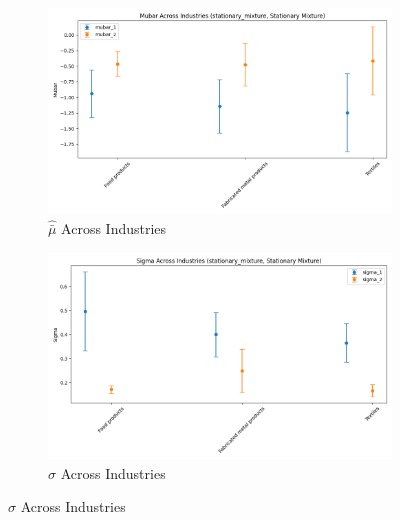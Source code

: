 \documentclass{article}
\begin{document}
\begin{figure}[ht!]
    \begin{subfigure}[t]{0.32\textwidth}
        \centering
        \includegraphics[width=\textwidth]{figure/stationary_mixture_mubar_across_industries.png}
        \caption{$\hat{\bar\mu}$ Across Industries}

    \end{subfigure}
    \begin{subfigure}[t]{0.32\textwidth}
        \centering
        \includegraphics[width=\textwidth]{figure/stationary_mixture_sigma_across_industries.png}
        \caption{$\hat\sigma$ Across Industries}
    \end{subfigure}
\end{figure}
\end{document}
